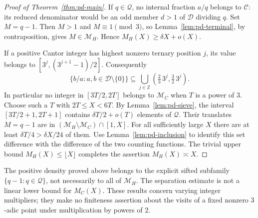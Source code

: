 \begin{proof}[Proof of Theorem~\ref{thm:pd-main}]
If $q\in\mathcal Q$, no internal fraction $a/q$ belongs to
$\mathcal C$: its reduced denominator would be an odd member $d>1$
of $\mathscr D$ dividing $q$. Set $M=q-1$. Then $M>1$ and
$M\equiv1\pmod3$, so Lemma~\ref{lem:pd-terminal}, by contraposition,
gives $M\in\mathcal M_H$. Hence $M_H(X)\geq\delta X+o(X)$.

If a positive Cantor integer has highest nonzero ternary position $j$,
its value belongs to $[3^j,(3^{j+1}-1)/2]$. Consequently
\[
 \{b/a:a,b\in\mathcal D\setminus\{0\}\}
   \subseteq\bigcup_{j\in\mathbb Z}
       \left(\tfrac23\,3^j,\tfrac32\,3^j\right).
\]
In particular no integer in $[3T/2,2T]$ belongs to $\mathcal M_C$
when $T$ is a power of $3$. Choose such a $T$ with $2T\leq X<6T$.
By Lemma~\ref{lem:pd-sieve}, the interval
$[3T/2+1,2T+1]$ contains $\delta T/2+o(T)$ elements of $\mathcal Q$.
Their translates $M=q-1$ are in
$(\mathcal M_H\setminus\mathcal M_C)\cap[1,X]$. For all sufficiently
large $X$ there are at least $\delta T/4>\delta X/24$ of them.
Use Lemma~\ref{lem:pd-inclusion} to identify this set difference
with the difference of the two counting functions. The trivial upper
bound $M_H(X)\leq\lfloor X\rfloor$ completes the assertion
$M_H(X)\asymp X$.
\end{proof}

\begin{remark}
The positive density proved above belongs to the explicit sifted
subfamily $\{q-1:q\in\mathcal Q\}$, not necessarily to all of
$\mathcal M_H$. The separation estimate is not a linear lower bound
for $M_C(X)$. These results concern varying integer multipliers; they
make no finiteness assertion about the visits of a fixed nonzero
$3$-adic point under multiplication by powers of $2$.
\end{remark}
